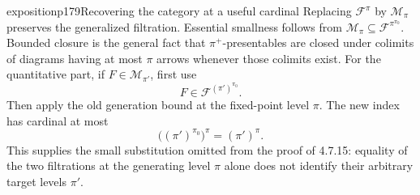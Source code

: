 \begin{dcomment}{exposition}{p179}{Recovering the category at a useful cardinal}
Replacing $\mathcal F^\pi$ by $\mathcal M_\pi$ preserves the generalized filtration. Essential smallness follows from $\mathcal M_\pi\subseteq\mathcal F^{\pi^{\pi_0}}$. Bounded closure is the general fact that $\pi^+$-presentables are closed under colimits of diagrams having at most $\pi$ arrows whenever those colimits exist. For the quantitative part, if $F\in\mathcal M_{\pi'}$, first use
\[
 F\in\mathcal F^{(\pi')^{\pi_0}}.
\]
Then apply the old generation bound at the fixed-point level $\pi$. The new index has cardinal at most
\[
 \bigl((\pi')^{\pi_0}\bigr)^\pi=(\pi')^\pi.
\]
This supplies the small substitution omitted from the proof of 4.7.15: equality of the two filtrations at the generating level $\pi$ alone does not identify their arbitrary target levels $\pi'$.
\end{dcomment}

